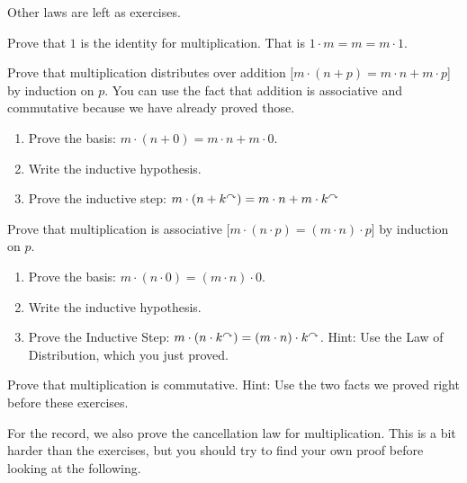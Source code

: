 Other laws are left as exercises.

\ipadbreak

\begin{exercises}
  \begin{exerciselist}
\item Prove that $1$ is the identity for multiplication. That is $1\cdot m = m  = m\cdot 1$.
\item Prove that multiplication distributes over addition [$m\cdot
  (n+p) = m\cdot n + m\cdot p$] by induction on $p$.  You can use the
  fact that addition is associative and commutative because we have
  already proved those.
  \begin{enumerate}
  \item Prove the basis: $m\cdot(n+0) = m\cdot n + m\cdot 0$.
  \item Write the inductive hypothesis.
  \item Prove the inductive step: $m\cdot(n+k^\curvearrowright) = m\cdot n +
    m\cdot k^\curvearrowright$
  \end{enumerate}
 
\item Prove that multiplication is associative [$m\cdot(n\cdot p) =
  (m\cdot n)\cdot p$] by induction on $p$.
  \begin{enumerate}
  \item Prove the basis: $m\cdot (n\cdot 0) = (m\cdot n)\cdot 0$.
  \item Write the inductive hypothesis.
  \item Prove the Inductive Step: $m\cdot (n\cdot k^\curvearrowright) = (m\cdot
    n)\cdot k^\curvearrowright$. Hint: Use the Law of Distribution, which you just
    proved.
  \end{enumerate}

\item Prove that multiplication is commutative. Hint: Use the two facts 
we proved right before these exercises.

  \end{exerciselist}
\end{exercises}

\ipadbreak

For the record, we also prove the cancellation law for multiplication. This is a bit harder than the exercises, but you should try to find your own proof before looking at the following.

